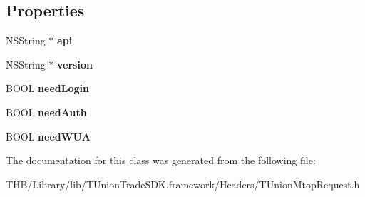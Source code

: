\subsection*{Properties}
\begin{DoxyCompactItemize}
\item 
\mbox{\label{interface_t_union_mtop_request_adc692f41c06a06ce23b10d220aed186e}} 
N\+S\+String $\ast$ {\bfseries api}
\item 
\mbox{\label{interface_t_union_mtop_request_a4d6a5335ec5f655c64a6990127c65c3e}} 
N\+S\+String $\ast$ {\bfseries version}
\item 
\mbox{\label{interface_t_union_mtop_request_a3768de62e3dd167b8c2a76287a851a57}} 
B\+O\+OL {\bfseries need\+Login}
\item 
\mbox{\label{interface_t_union_mtop_request_ab57d32ed67322a7fb6907ae4e377ec1c}} 
B\+O\+OL {\bfseries need\+Auth}
\item 
\mbox{\label{interface_t_union_mtop_request_ae35f2d3869275aceac716c3522669c42}} 
B\+O\+OL {\bfseries need\+W\+UA}
\end{DoxyCompactItemize}


The documentation for this class was generated from the following file\+:\begin{DoxyCompactItemize}
\item 
T\+H\+B/\+Library/lib/\+T\+Union\+Trade\+S\+D\+K.\+framework/\+Headers/T\+Union\+Mtop\+Request.\+h\end{DoxyCompactItemize}
